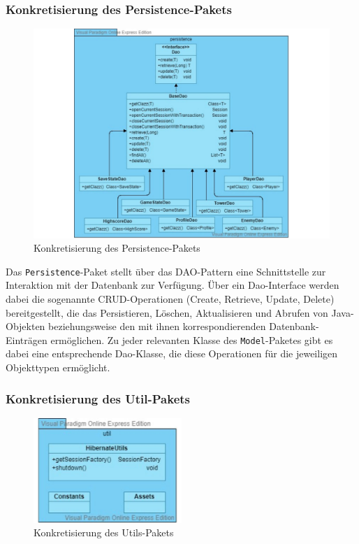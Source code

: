 \documentclass[enabledeprecatedfontcommands,fontsize=12pt,paper=a4,twoside,parskip=half]{scrartcl}
\begin{document}
\subsubsection{Konkretisierung des Persistence-Pakets}
\begin{figure}[H]
    \centering
    \includegraphics[width=\textwidth]{Bilder/KlassendiagrammPersistence.pdf}
    \caption{Konkretisierung des Persistence-Pakets}
    \label{fig:persPak}
\end{figure}
Das \texttt{Persistence}-Paket stellt über das DAO-Pattern eine Schnittstelle zur Interaktion mit der Datenbank zur Verfügung. Über ein Dao-Interface werden dabei die sogenannte CRUD-Operationen (Create, Retrieve, Update, Delete) bereitgestellt, die das Persistieren, Löschen, Aktualisieren und Abrufen von Java-Objekten beziehungsweise den mit ihnen korrespondierenden Datenbank-Einträgen ermöglichen. Zu jeder relevanten Klasse des \texttt{Model}-Paketes gibt es dabei eine entsprechende Dao-Klasse, die diese Operationen für die jeweiligen Objekttypen ermöglicht.

\subsubsection{Konkretisierung des Util-Pakets}
\begin{figure}[H]
    \centering
    \includegraphics[width=0.5\textwidth]{Bilder/KlassendiagrammUtils.pdf}
    \caption{Konkretisierung des Utils-Pakets}
    \label{fig:utilPak}
\end{figure}
\end{document}
